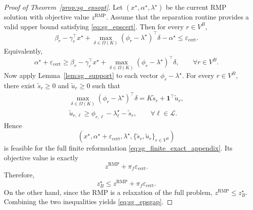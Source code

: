 \begin{proof}[Proof of Theorem~\ref{prop:sg_epsopt}]
Let $(x^{\star},\alpha^{\star},\lambda^{\star})$ be the current RMP solution with objective value
$z^{\mathrm{RMP}}$. Assume that the separation routine provides a valid upper bound satisfying
\eqref{eq:sg_epscert}. Then for every $r\in V^B$,
\[
\beta_r-\gamma_r^\top x^{\star}
+\max_{\delta\in\Omega(K)}(\phi_r-\lambda^{\star})^\top\delta
-\alpha^{\star}
\le \varepsilon_{\mathrm{cert}}.
\]
Equivalently,
\[
\alpha^{\star}+\varepsilon_{\mathrm{cert}}
\ge
\beta_r-\gamma_r^\top x^{\star}
+\max_{\delta\in\Omega(K)}(\phi_r-\lambda^{\star})^\top\delta,
\qquad \forall r\in V^B.
\]
Now apply Lemma~\ref{lem:sg_support} to each vector $\phi_r-\lambda^{\star}$.
For every $r\in V^B$, there exist $\tilde s_r\ge 0$ and $\tilde u_r\ge 0$ such that
\[
\begin{aligned}
    \max_{\delta\in\Omega(K)}(\phi_r-\lambda^{\star})^\top\delta
=K\tilde s_r+\mathbf 1^\top \tilde u_r, \\
\tilde u_{r,\ell}\ge \phi_{r,\ell}-\lambda_\ell^{\star}-\tilde s_r,
\qquad \forall \ell\in\mathcal L.
\end{aligned}
\]
Hence
\[
(x^{\star},\alpha^{\star}+\varepsilon_{\mathrm{cert}},\lambda^{\star},\{\tilde s_r,\tilde u_r\}_{r\in V^B})
\]
is feasible for the full finite reformulation \eqref{eq:sg_finite_exact_appendix}. Its objective value is exactly
\[
z^{\mathrm{RMP}}+\pi_f\varepsilon_{\mathrm{cert}}.
\]
Therefore,
\[
z_B^{\star}\le z^{\mathrm{RMP}}+\pi_f\varepsilon_{\mathrm{cert}}.
\]
On the other hand, since the RMP is a relaxation of the full problem,
$z^{\mathrm{RMP}}\le z_B^{\star}$. Combining the two inequalities yields
\eqref{eq:sg_epsgap}.
\end{proof}

